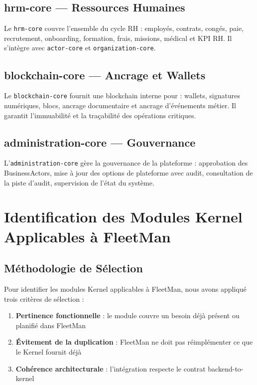 \documentclass[12pt,a4paper]{report}
\begin{document}
\section{hrm-core — Ressources Humaines}

Le \texttt{hrm-core} couvre l'ensemble du cycle RH : employés, contrats, congés, paie, recrutement, onboarding, formation, frais, missions, médical et KPI RH. Il s'intègre avec \texttt{actor-core} et \texttt{organization-core}.

\section{blockchain-core — Ancrage et Wallets}

Le \texttt{blockchain-core} fournit une blockchain interne pour : wallets, signatures numériques, blocs, ancrage documentaire et ancrage d'événements métier. Il garantit l'immuabilité et la traçabilité des opérations critiques.

\section{administration-core — Gouvernance}

L'\texttt{administration-core} gère la gouvernance de la plateforme : approbation des BusinessActors, mise à jour des options de plateforme avec audit, consultation de la piste d'audit, supervision de l'état du système.

\chapter{Identification des Modules Kernel Applicables à FleetMan}

\section{Méthodologie de Sélection}

Pour identifier les modules Kernel applicables à FleetMan, nous avons appliqué trois critères de sélection :

\begin{enumerate}[leftmargin=2cm]
  \item \textbf{Pertinence fonctionnelle} : le module couvre un besoin déjà présent ou planifié dans FleetMan
  \item \textbf{Évitement de la duplication} : FleetMan ne doit pas réimplémenter ce que le Kernel fournit déjà
  \item \textbf{Cohérence architecturale} : l'intégration respecte le contrat backend-to-kernel
\end{enumerate}
\end{document}
